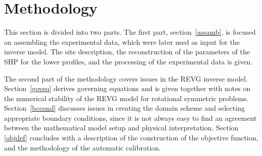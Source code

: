 \documentclass[review,times,3p,10pt]{elsarticle}
\begin{document}
\section{Methodology}%
\label{metodo}


This section is divided into two parts. The first part, section~\ref{assamb}, is focused on assembling the experimental data, which were later used as input for the inverse model. The site description, the reconstruction of the parameters of the SHP for the lower profiles, and the processing of the experimental data is given.   

The second part of the methodology covers issues in the REVG inverse model. Section~\ref{goveq} derives governing equations and is given together with notes on the numerical stability of the REVG model for rotational symmetric problems.
Section~\ref{bccond} discusses issues in creating the domain scheme and selecting appropriate boundary conditions, since it is not always easy to find an agreement between the mathematical model setup and  physical interpretation. Section \ref{objdef} concludes with a description of the construction of the objective function, and the methodology of the automatic calibration. 
\end{document}
